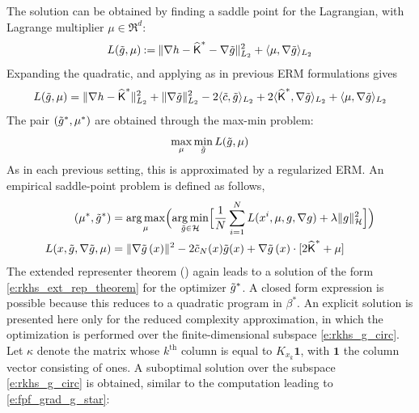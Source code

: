 The solution can be obtained by finding a saddle point for the Lagrangian,  with Lagrange multiplier $\mu  \in\Re^d$:
\begin{equation}
L(\tilg, \mu ) \eqdef   \| \nabla h - \hakFPF^* - \nabla \tilg \|^2_{L_2} +  \langle \mu ,  \nabla \tilg \rangle_{L_2}
\label{e:fpf_lag_dual}
\end{equation}
Expanding the quadratic, and applying  as in previous ERM formulations gives
\begin{equation}
L(\tilde g, \mu ) = \| \nabla h - \widehat{\text{\sf K}}^*\|_{L_2}^2 + \|\nabla \tilde g\|_{L_2}^2 - 2 \langle \tilde c, \tilde g \rangle_{L_2} + 2 \langle \widehat{\text{\sf K}}^*, \nabla \tilde g \rangle_{L_2} +  \langle \mu ,  \nabla \tilde g \rangle_{L_2}
\end{equation}
The pair $(\tilde g^*,\mu^*) $ are obtained through the max-min problem:
\begin{equation}
\max_\mu \min_{\tilde g}
L(\tilde g, \mu )
\end{equation}
As in each previous setting, this is approximated by a regularized ERM.
An empirical saddle-point problem is defined as follows,
\begin{equation}
\begin{aligned}
(\mu^* ,  \tilde g^*)  & =
\mathop{\rm arg{\,}max}_\mu  \Bigl(\mathop{\rm arg{\,}min}_{\tilde g \in {\cal H}} \Bigl[ \frac{1}{N} \sum_{i=1}^N  L(x^i,\mu, g,\nabla g) + \lambda \|g\|^2_{\cal H} \Bigr] \Bigr) \\
L(x,\tilde g,\nabla \tilde g, \mu)
&= \|\nabla \tilde g\, (x) \|^2    - 2   \tilde c_N(x)   \tilde g (x) +     \nabla \tilde g \, (x) \cdot [2 \widehat{\text{\sf K}}^*   + \mu]
\end{aligned}
\end{equation}
The extended representer theorem () again leads to a solution of the form \eqref{e:rkhs_ext_rep_theorem} for the optimizer $ \tilde g^*$.
A closed form expression is possible because this reduces to a quadratic program in $\beta^*$. An explicit solution is presented here only for the reduced complexity approximation, in which the optimization is performed over the finite-dimensional subspace \eqref{e:rkhs_g_circ}. Let $\kappa$ denote the matrix whose $k^{\text{th}}$ column is equal to $K_{x_k}\pmb{1}$,  with $\pmb{1}$ the column vector consisting of ones.   A suboptimal solution over the subspace \eqref{e:rkhs_g_circ} is obtained, similar to the computation leading to   \eqref{e:fpf_grad_g_star}:
